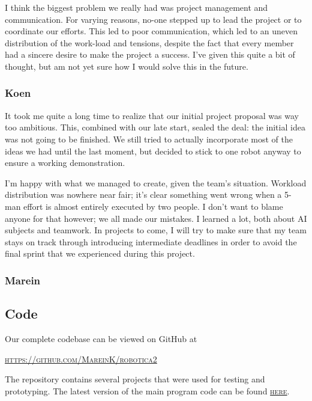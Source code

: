 \documentclass[10pt, abstracton, twocolumn]{scrartcl}
\newcommand{\link}[2]{\textsc{\href{#1}{#2}}}
\begin{document}
\begin{appendices}
I think the biggest problem we really had was project management and communication. For varying reasons, no-one stepped up to lead the project or to coordinate our efforts. This led to poor communication, which led to an uneven distribution of the work-load and tensions, despite the fact that every member had a sincere desire to make the project a success. I’ve given this quite a bit of thought, but am not yet sure how I would solve this in the future. 

\subsubsection{Koen}
It took me quite a long time to realize that our initial project proposal was way too ambitious. This, combined with our late start, sealed the deal: the initial idea was not going to be finished. We still tried to actually incorporate most of the ideas we had until the last moment, but decided to stick to one robot anyway to ensure a working demonstration. 

I'm happy with what we managed to create, given the team's situation. Workload distribution was nowhere near fair; it's clear something went wrong when a 5-man effort is almost entirely executed by two people. I don't want to blame anyone for that however; we all made our mistakes. I learned a lot, both about AI subjects and teamwork. In projects to come, I will try to make sure that my team stays on track through introducing intermediate deadlines in order to avoid the final sprint that we experienced during this project.

\subsubsection{Marein}

\begin{samepage}

\section{Code}
Our complete codebase can be viewed on GitHub at
\nolinebreak
\begin{center}
\link{https://github.com/MareinK/robotica2}{https://github.com/MareinK/robotica2}
\end{center}

\end{samepage}

The repository contains several projects that were used for testing and prototyping. The latest version of the main program code can be found \link{https://github.com/MareinK/robotica2/tree/master/Code/v1/Main}{here}.


\end{appendices}
\end{document}

